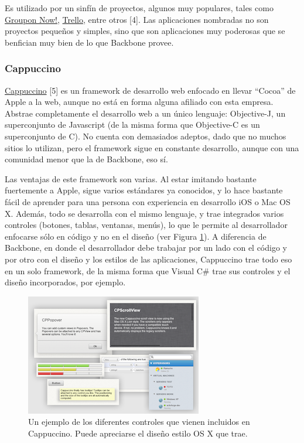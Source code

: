 \documentclass[12pt,titlepage,]{article}
\makeatletter
\def\maxwidth{\ifdim\Gin@nat@width>\linewidth\linewidth
\else\Gin@nat@width\fi}
\let\Oldincludegraphics\includegraphics
\renewcommand{\includegraphics}[1]{\Oldincludegraphics[width=\maxwidth]{#1}}
\makeatother
\begin{document}
Es utilizado por un sinfín de proyectos, algunos muy populares, tales
como \href{http://www.groupon.com/now}{Groupon Now!},
\href{http://trello.com}{Trello}, entre otros {[}4{]}. Las aplicaciones
nombradas no son proyectos pequeños y simples, sino que son aplicaciones
muy poderosas que se benfician muy bien de lo que Backbone provee.

\subsubsection{Cappuccino}

\href{http://cappuccino-project.org}{Cappuccino} {[}5{]} es un framework
de desarrollo web enfocado en llevar ``Cocoa'' de Apple a la web, aunque
no está en forma alguna afiliado con esta empresa. Abstrae completamente
el desarrollo web a un único lenguaje: Objective-J, un superconjunto de
Javascript (de la misma forma que Objective-C es un superconjunto de C).
No cuenta con demasiados adeptos, dado que no muchos sitios lo utilizan,
pero el framework sigue en constante desarrollo, aunque con una
comunidad menor que la de Backbone, eso sí.

Las ventajas de este framework son varias. Al estar imitando bastante
fuertemente a Apple, sigue varios estándares ya conocidos, y lo hace
bastante fácil de aprender para una persona con experiencia en
desarrollo iOS o Mac OS X. Además, todo se desarrolla con el mismo
lenguaje, y trae integrados varios controles (botones, tablas, ventanas,
menús), lo que le permite al desarrollador enfocarse sólo en código y no
en el diseño (ver Figura \ref{figure:cappuccino}). A diferencia de
Backbone, en donde el desarrollador debe trabajar por un lado con el
código y por otro con el diseño y los estilos de las aplicaciones,
Cappuccino trae todo eso en un solo framework, de la misma forma que
Visual C\# trae sus controles y el diseño incorporados, por ejemplo.

\begin{figure}[htbp]
\centering
\includegraphics{figures/cappuccino-widgets.png}
\caption{Un ejemplo de los diferentes controles que vienen incluidos en
Cappuccino. Puede apreciarse el diseño estilo OS X que trae.
\label{figure:cappuccino}}
\end{figure}
\end{document}

